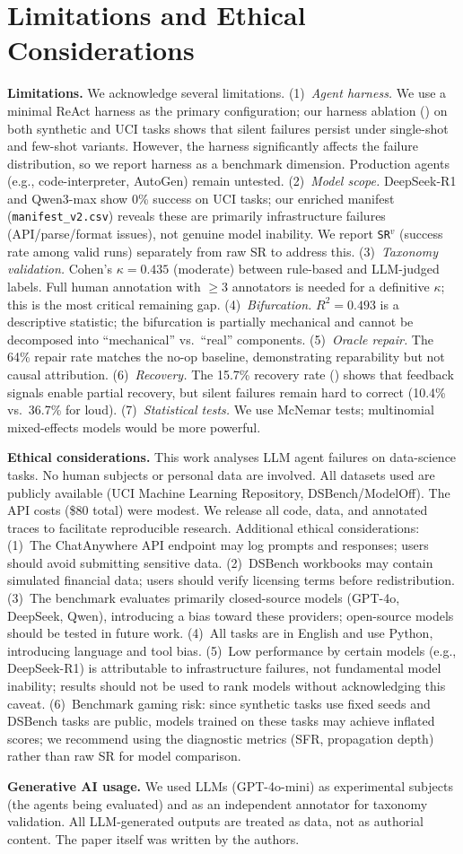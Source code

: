 \section{Limitations and Ethical Considerations}
\label{sec:limits-ethics}

\textbf{Limitations.} We acknowledge several limitations. (1)~\emph{Agent harness.} We use a minimal ReAct harness as the primary configuration; our harness ablation () on both synthetic and UCI tasks shows that silent failures persist under single-shot and few-shot variants. However, the harness significantly affects the failure distribution, so we report harness as a benchmark dimension. Production agents (e.g., code-interpreter, AutoGen) remain untested. (2)~\emph{Model scope.} DeepSeek-R1 and Qwen3-max show 0\% success on UCI tasks; our enriched manifest (\texttt{manifest\_v2.csv}) reveals these are primarily infrastructure failures (API/parse/format issues), not genuine model inability. We report \texttt{SR$^v$} (success rate among valid runs) separately from raw SR to address this. (3)~\emph{Taxonomy validation.} Cohen's $\kappa = 0.435$ (moderate) between rule-based and LLM-judged labels. Full human annotation with $\geq 3$ annotators is needed for a definitive $\kappa$; this is the most critical remaining gap. (4)~\emph{Bifurcation.} $R^2 = 0.493$ is a descriptive statistic; the bifurcation is partially mechanical and cannot be decomposed into ``mechanical'' vs.\ ``real'' components. (5)~\emph{Oracle repair.} The 64\% repair rate matches the no-op baseline, demonstrating reparability but not causal attribution. (6)~\emph{Recovery.} The 15.7\% recovery rate () shows that feedback signals enable partial recovery, but silent failures remain hard to correct (10.4\% vs.\ 36.7\% for loud). (7)~\emph{Statistical tests.} We use McNemar tests; multinomial mixed-effects models would be more powerful.

\textbf{Ethical considerations.} This work analyses LLM agent failures on data-science tasks. No human subjects or personal data are involved. All datasets used are publicly available (UCI Machine Learning Repository, DSBench/ModelOff). The API costs (\$80 total) were modest. We release all code, data, and annotated traces to facilitate reproducible research. Additional ethical considerations: (1)~The ChatAnywhere API endpoint may log prompts and responses; users should avoid submitting sensitive data. (2)~DSBench workbooks may contain simulated financial data; users should verify licensing terms before redistribution. (3)~The benchmark evaluates primarily closed-source models (GPT-4o, DeepSeek, Qwen), introducing a bias toward these providers; open-source models should be tested in future work. (4)~All tasks are in English and use Python, introducing language and tool bias. (5)~Low performance by certain models (e.g., DeepSeek-R1) is attributable to infrastructure failures, not fundamental model inability; results should not be used to rank models without acknowledging this caveat. (6)~Benchmark gaming risk: since synthetic tasks use fixed seeds and DSBench tasks are public, models trained on these tasks may achieve inflated scores; we recommend using the diagnostic metrics (SFR, propagation depth) rather than raw SR for model comparison.

\textbf{Generative AI usage.} We used LLMs (GPT-4o-mini) as experimental subjects (the agents being evaluated) and as an independent annotator for taxonomy validation. All LLM-generated outputs are treated as data, not as authorial content. The paper itself was written by the authors.
